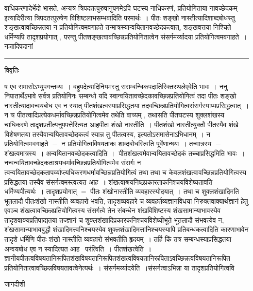 \documentclass[10pt, openany]{book}
\begin{document}
{{\la वाधिकरणादेर्भेदो भासते, अन्यत्र त्रिपदतत्पुरुषानुपगमेऽपि घटस्य नाधिकरणं, प्रतियोगिताया नावच्छेदकम् इत्यादिरीत्या त्रिपदतत्पुरुषेण विशिष्टलाभसम्भवादिति परमार्थः~। पीतः शङ्खो नास्तीत्यादिशाब्दबोधस्तु शङ्खत्वावच्छिन्नतया न प्रतियोगित्वमवगाहते तन्मात्रस्यान्वयितानवच्छेदकत्वात्, शङ्खवत्तया निश्चिते धर्मिण्यपि तादृशप्रयोगात् , परन्तु पीतशङ्खत्वावच्छिन्नप्रतियोगितात्वेन संसर्गमर्य्यादया प्रतियोगित्वमवगाहते~। नञादिपदानां}\\
\hrule
\begin{center}     विवृतिः \end{center}
ष एव समासोऽभ्युपगन्तव्यः~। बहुपदेत्यादिनियमस्तु ससम्बन्धिकपदातिरिक्तस्थलेएवेति भावः~। ननु निपातार्थेऽभावे सर्वत्र प्रतियोगिनः सम्बन्धो यदि स्वान्वयितावच्छेदकावच्छिन्नप्रतियोगित्वं तदा पीतः शङ्खो नास्तीत्यादावन्वयबोध एव न स्यात् पीतशंखत्वस्याप्रसिद्धतया तदवच्छिन्नप्रतियोगित्वसंसर्गस्याप्यप्रसिद्धत्वात्~।
न च पीतत्वादिप्रत्येकधर्मावच्छिन्नप्रतियोगित्वमेव तथेति वाच्यम् , तथासति पीतघटस्य शुक्लशंखस्य चाधिकरणे तादृशप्रतीत्यनुपपत्तेरित्यत आह\textendash पीतः शंखो नास्तीति~। पीतशंखो नास्तीत्युक्तौ पीतस्यैव शंखे विशेषणतया तस्यैवान्वयितावच्छेदकत्वं स्यान्न तु पीतत्वस्य, इत्यतोऽसमासेनाऽभिधानम्~। न प्रतियोगित्वमवगाहते $=$ न प्रतियोगित्वविषयताकः शाब्दबोधस्त्विति पूर्वेणान्षयः~। तन्मात्रस्य $=$ शंखत्वमात्रस्य~। {\qt अन्वयितानवच्छेदकत्वादिति}~।~पीतशंखत्वमेवान्वयितावच्छेदकं तच्चाप्रसिद्धमिति भावः~। नन्वन्वयितावच्छेदकताश्रयधर्मावच्छिन्नप्रतियोगित्वमेव संसर्गः न त्वन्वयितावच्छेदकतापर्य्याप्त्यधिकरणधर्मावच्छिन्नप्रतियोगित्वं तथा तथा च केवलशंखत्वावच्छिन्नप्रतियोगित्वस्य प्रसिद्धतया तस्यैव संसर्गत्वमस्त्वत्यत आह~। शंखत्वाश्रयनिष्ठप्रकारताकनिश्चयविशेष्यतावति धर्मिण्यपीत्यर्थः~। तादृशप्रयोगात् $=$ पीतः शंखोनास्तीति व्यवहारस्योदयात्~। तथा च शुक्लशंखादिमति भूतलादौ पीतःशंखो नास्तीति व्यवहारो भवति, तादृशव्यवहारे च व्यवहर्तव्यज्ञानविधया
निरुक्तवाक्यार्थज्ञानं हेतु एवञ्च शंखत्वावच्छिन्नप्रतियोगित्वस्य संसर्गत्वे तेन संबन्धेन शंखविशिष्टस्य शंखसामान्याभावस्येव तादृशवाक्यप्रतिपाद्यतया तज्ज्ञानं च
शुक्लशंखादिप्रकारकनिश्चयविशेष्यीभूते भूतलादौ संभवत्येव न, शंखसामान्याभावबुद्धौ शंखादिमत्त्वनिश्चयस्येव शुक्लशंखादिमत्तानिश्चयस्यापि प्रतिबन्धकत्वादिति कारणाभावेन तादृशे धर्मिणि पीतः शंखो नास्तीति व्यवहारो संभवतीति हृदयम्~। तर्हि किं तत्र सम्बन्धस्याप्रसिद्धतया अन्वयबोध एव न स्यादित्यत आह \textendash ~{\qt परंत्विति~। पीतशंखत्वेति~।}ज्ञानीयपीतत्वविषयतानिरूपितशंखविषयतानिरूपितशंखत्वविषयतानिरूपिताऽवच्छिन्नत्वविषयतानिरूपित प्रतियोगितात्वावच्छिन्नविषयतावत्वेनेत्यर्थः~। संसर्गमर्य्यादयेति~।संसर्गत्वाऽभिन्ना या
तादृशप्रतियोगित्ववि
\newpage
\begin{center} जागदीशी \end{center}
}
\end{document}
